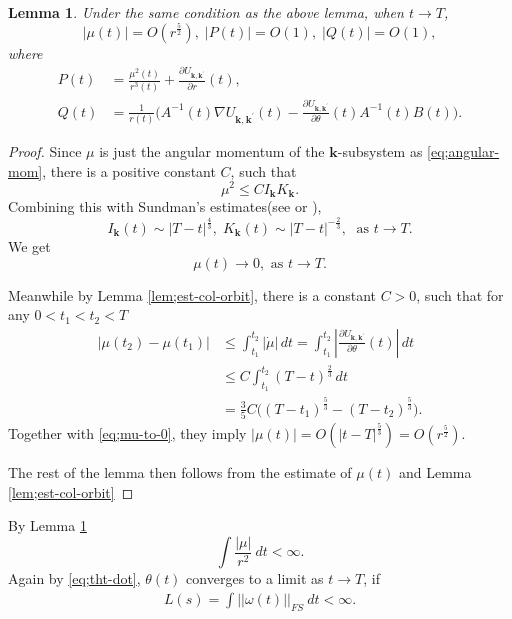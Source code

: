 \documentclass[11pt]{amsart}
\newtheorem{lemma}[theorem]{Lemma}
\theoremstyle{definition}
\theoremstyle{remark}
\numberwithin{equation}{section}
\newcommand{\bk}{\mathbf k}
\begin{document}
\begin{lemma}
\label{lem;est-col-mu} Under the same condition as the above lemma, when $t \to T$, 
$$|\mu(t)|=O(r^\frac{5}{2}), \; |P(t)|=O(1), \; |Q(t)|=O(1), $$
where 
\begin{align*}
    P(t)& =\frac{\mu^2(t)}{r^3(t)}+\frac{\partial U_{\mathbf{k},\mathbf{k}^\prime}}{\partial r}(t),   \\
    Q(t)& =\frac{1}{r(t)}\Big(A^{-1}(t)\nabla U_{\mathbf{k},\mathbf{k}^\prime}(t)-\frac{\partial U_{\mathbf{k},\mathbf{k}^\prime}}{\partial\theta}(t)A^{-1}(t)B(t)\Big).
\end{align*} 
\end{lemma}
\begin{proof}
    Since $\mu$ is just the angular momentum of the $\bk$-subsystem as \eqref{eq;angular-mom}, there is a positive constant $C$, such that
    \begin{equation*}
        \mu^2\le C I_\mathbf{k}K_{\mathbf{k}}.
    \end{equation*} 
    Combining this with Sundman's estimates(see \cite{Sp70} or \cite[Proposition 6.25]{FT04}), 
    $$ I_{\mathbf{k}}(t)\sim |T-t|^\frac{4}{3}, \; K_{\mathbf{k}}(t)\sim |T-t|^{-\frac{2}{3}}, \; \text{ as } t \to T. $$
    We get 
    \begin{equation}
    \label{eq;mu-to-0} \mu(t) \to 0, \text{ as } t \to T. 
    \end{equation}

    Meanwhile by Lemma \ref{lem;est-col-orbit}, there is a constant $C>0$, such that for any $0<t_1<t_2<T$ 
    \begin{align*}
        |\mu(t_2)-\mu(t_1)|&\le\int^{t_2}_{t_1}|\dot{\mu}|\,dt =\int^{t_2}_{t_1}|\frac{\partial U_{\mathbf{k},\mathbf{k}^\prime}}{\partial \theta}(t)| \,dt\\
        &\le C\int^{t_2}_{t_1}(T-t)^\frac{2}{3}\,dt\\
        &=\frac{3}{5}C\Big((T-t_1)^\frac{5}{3}-(T-t_2)^\frac{5}{3}\Big).
    \end{align*} 
Together with \eqref{eq;mu-to-0}, they imply $|\mu(t)|=O(|t-T|^\frac{5}{3})=O(r^\frac{5}{2})$.

The rest of the lemma then follows from the estimate of $\mu(t)$ and Lemma \ref{lem;est-col-orbit}
\end{proof}
 

By Lemma \ref{lem;est-col-mu}  
$$ \int\frac{|\mu|}{r^2}\ dt<\infty. $$ 
Again by \eqref{eq;tht-dot}, $\theta(t)$ converges to a limit as $t\rightarrow T$, if 
\begin{align*}
    L(s)=\int ||\omega(t)||_{FS}\ dt<\infty.
\end{align*}
\end{document}
